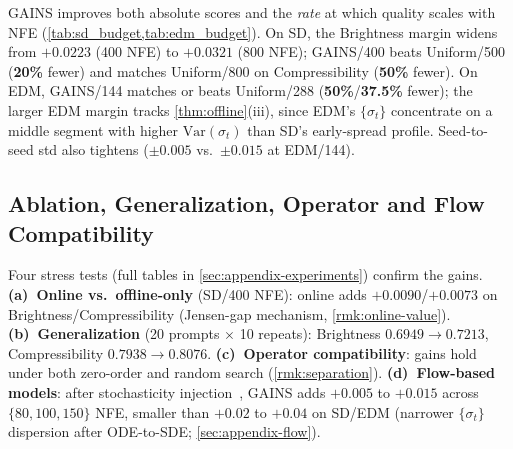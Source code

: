 \textsc{GAINS} improves both absolute scores and the \emph{rate} at which quality scales with NFE (\cref{tab:sd_budget,tab:edm_budget}). On SD, the Brightness margin widens from $+0.0223$ (400 NFE) to $+0.0321$ (800 NFE); \textsc{GAINS}/400 beats Uniform/500 (\textbf{20\%} fewer) and matches Uniform/800 on Compressibility (\textbf{50\%} fewer). On EDM, \textsc{GAINS}/144 matches or beats Uniform/288 (\textbf{50\%}/\textbf{37.5\%} fewer); the larger EDM margin tracks \cref{thm:offline}\textup{(iii)}, since EDM's $\{\sigma_t\}$ concentrate on a middle segment with higher $\mathrm{Var}(\sigma_t)$ than SD's early-spread profile. Seed-to-seed std also tightens ($\pm 0.005$ vs.\ $\pm 0.015$ at EDM/144).

\subsection{Ablation, Generalization, Operator and Flow Compatibility}
\label{sec:exp-ablation}

Four stress tests (full tables in \cref{sec:appendix-experiments}) confirm the gains. \textbf{(a)~Online vs.\ offline-only} (SD/400 NFE): online adds $+0.0090$/$+0.0073$ on Brightness/Compressibility (Jensen-gap mechanism, \cref{rmk:online-value}). \textbf{(b)~Generalization} (20 prompts $\times$ 10 repeats): Brightness $0.6949\!\to\!0.7213$, Compressibility $0.7938\!\to\!0.8076$. \textbf{(c)~Operator compatibility}: gains hold under both zero-order and random search (\cref{rmk:separation}). \textbf{(d)~Flow-based models}: after stochasticity injection~\citep{dockhorn2024stochastic,kim2025rbf}, \textsc{GAINS} adds $+0.005$ to $+0.015$ across $\{80,100,150\}$ NFE, smaller than $+0.02$ to $+0.04$ on SD/EDM (narrower $\{\sigma_t\}$ dispersion after ODE-to-SDE; \cref{sec:appendix-flow}).
